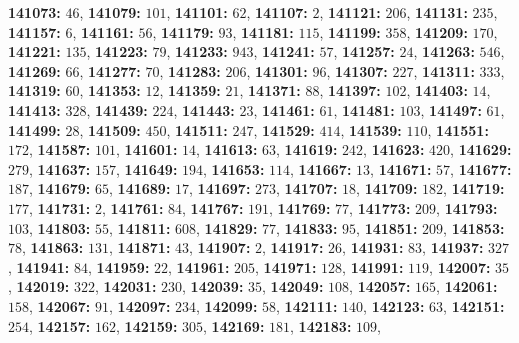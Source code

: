 \textsf{\bfseries 141073:} $46$, \textsf{\bfseries 141079:} $101$, \textsf{\bfseries 141101:} $62$, \textsf{\bfseries 141107:} $2$, \textsf{\bfseries 141121:} $206$, \textsf{\bfseries 141131:} $235$, \textsf{\bfseries 141157:} $6$, \textsf{\bfseries 141161:} $56$, \textsf{\bfseries 141179:} $93$, \textsf{\bfseries 141181:} $115$, \textsf{\bfseries 141199:} $358$, \textsf{\bfseries 141209:} $170$, \textsf{\bfseries 141221:} $135$, \textsf{\bfseries 141223:} $79$, \textsf{\bfseries 141233:} $943$, \textsf{\bfseries 141241:} $57$, \textsf{\bfseries 141257:} $24$, \textsf{\bfseries 141263:} $546$, \textsf{\bfseries 141269:} $66$, \textsf{\bfseries 141277:} $70$, \textsf{\bfseries 141283:} $206$, \textsf{\bfseries 141301:} $96$, \textsf{\bfseries 141307:} $227$, \textsf{\bfseries 141311:} $333$, \textsf{\bfseries 141319:} $60$, \textsf{\bfseries 141353:} $12$, \textsf{\bfseries 141359:} $21$, \textsf{\bfseries 141371:} $88$, \textsf{\bfseries 141397:} $102$, \textsf{\bfseries 141403:} $14$, \textsf{\bfseries 141413:} $328$, \textsf{\bfseries 141439:} $224$, \textsf{\bfseries 141443:} $23$, \textsf{\bfseries 141461:} $61$, \textsf{\bfseries 141481:} $103$, \textsf{\bfseries 141497:} $61$, \textsf{\bfseries 141499:} $28$, \textsf{\bfseries 141509:} $450$, \textsf{\bfseries 141511:} $247$, \textsf{\bfseries 141529:} $414$, \textsf{\bfseries 141539:} $110$, \textsf{\bfseries 141551:} $172$, \textsf{\bfseries 141587:} $101$, \textsf{\bfseries 141601:} $14$, \textsf{\bfseries 141613:} $63$, \textsf{\bfseries 141619:} $242$, \textsf{\bfseries 141623:} $420$, \textsf{\bfseries 141629:} $279$, \textsf{\bfseries 141637:} $157$, \textsf{\bfseries 141649:} $194$, \textsf{\bfseries 141653:} $114$, \textsf{\bfseries 141667:} $13$, \textsf{\bfseries 141671:} $57$, \textsf{\bfseries 141677:} $187$, \textsf{\bfseries 141679:} $65$, \textsf{\bfseries 141689:} $17$, \textsf{\bfseries 141697:} $273$, \textsf{\bfseries 141707:} $18$, \textsf{\bfseries 141709:} $182$, \textsf{\bfseries 141719:} $177$, \textsf{\bfseries 141731:} $2$, \textsf{\bfseries 141761:} $84$, \textsf{\bfseries 141767:} $191$, \textsf{\bfseries 141769:} $77$, \textsf{\bfseries 141773:} $209$, \textsf{\bfseries 141793:} $103$, \textsf{\bfseries 141803:} $55$, \textsf{\bfseries 141811:} $608$, \textsf{\bfseries 141829:} $77$, \textsf{\bfseries 141833:} $95$, \textsf{\bfseries 141851:} $209$, \textsf{\bfseries 141853:} $78$, \textsf{\bfseries 141863:} $131$, \textsf{\bfseries 141871:} $43$, \textsf{\bfseries 141907:} $2$, \textsf{\bfseries 141917:} $26$, \textsf{\bfseries 141931:} $83$, \textsf{\bfseries 141937:} $327$, \textsf{\bfseries 141941:} $84$, \textsf{\bfseries 141959:} $22$, \textsf{\bfseries 141961:} $205$, \textsf{\bfseries 141971:} $128$, \textsf{\bfseries 141991:} $119$, \textsf{\bfseries 142007:} $35$, \textsf{\bfseries 142019:} $322$, \textsf{\bfseries 142031:} $230$, \textsf{\bfseries 142039:} $35$, \textsf{\bfseries 142049:} $108$, \textsf{\bfseries 142057:} $165$, \textsf{\bfseries 142061:} $158$, \textsf{\bfseries 142067:} $91$, \textsf{\bfseries 142097:} $234$, \textsf{\bfseries 142099:} $58$, \textsf{\bfseries 142111:} $140$, \textsf{\bfseries 142123:} $63$, \textsf{\bfseries 142151:} $254$, \textsf{\bfseries 142157:} $162$, \textsf{\bfseries 142159:} $305$, \textsf{\bfseries 142169:} $181$, \textsf{\bfseries 142183:} $109$, 

